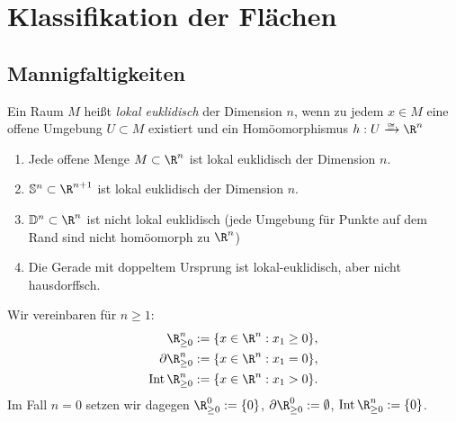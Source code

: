 \chapter{Klassifikation der Flächen}



\section{Mannigfaltigkeiten}


\begin{df}
	Ein Raum $M$ heißt \emph{lokal euklidisch} der Dimension $n$, wenn zu jedem $x \in M$ eine offene Umgebung $U \subset M$ existiert und ein Homöomorphismus $h: U \homeomorphicto \R^n$
\end{df}

\begin{ex}
	\begin{enumerate}[1)]
		\item
			Jede offene Menge $M \subset \R^n$ ist lokal euklidisch der Dimension $n$.
		\item
			$\S^n \subset \R^{n+1}$ ist lokal euklidisch der Dimension $n$.
		\item
			$\D^n \subset \R^n$ ist nicht lokal euklidisch (jede Umgebung für Punkte auf dem Rand sind nicht homöomorph zu $\R^n$)
		\item
			Die Gerade mit doppeltem Ursprung ist lokal-euklidisch, aber nicht hausdorffsch.
	\end{enumerate}
\end{ex}

Wir vereinbaren für $n \ge 1$:
\begin{align*}
	\R_{\ge 0}^n &:= \{ x \in \R^n : x_1 \ge 0 \}, \\
	\boundary \R_{\ge 0}^n &:= \{ x \in \R^n : x_1 = 0 \}, \\
	\Int \R_{\ge 0}^n &:= \{ x \in \R^n : x_1 > 0 \}.
\end{align*}
Im Fall $n = 0$ setzen wir dagegen $\R_{\ge 0}^0 := \{ 0 \}$, $\boundary \R_{\ge 0}^0 := \emptyset$, $\Int \R_{\ge 0}^n := \{ 0 \}$.

